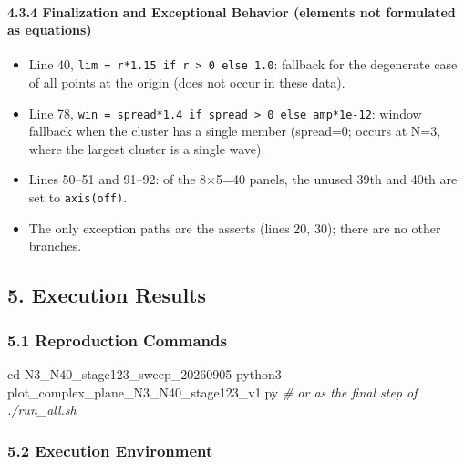 \documentclass[
  a4paper,
]{ltjsarticle}
\newenvironment{Shaded}{}{}
\newcommand{\BuiltInTok}[1]{\textcolor[rgb]{0.00,0.50,0.00}{#1}}
\newcommand{\CommentTok}[1]{\textcolor[rgb]{0.38,0.63,0.69}{\textit{#1}}}
\newcommand{\ExtensionTok}[1]{#1}
\newcommand{\NormalTok}[1]{#1}
\providecommand{\tightlist}{%
  \setlength{\itemsep}{0pt}\setlength{\parskip}{0pt}}
\begin{document}
\paragraph{4.3.4 Finalization and Exceptional Behavior (elements not
formulated as
equations)}\label{finalization-and-exceptional-behavior-elements-not-formulated-as-equations}

\begin{itemize}
\tightlist
\item
  Line 40, \texttt{lim\ =\ r*1.15\ if\ r\ \textgreater{}\ 0\ else\ 1.0}:
  fallback for the degenerate case of all points at the origin (does not
  occur in these data).
\item
  Line 78,
  \texttt{win\ =\ spread*1.4\ if\ spread\ \textgreater{}\ 0\ else\ amp*1e-12}:
  window fallback when the cluster has a single member (spread=0; occurs
  at N=3, where the largest cluster is a single wave).
\item
  Lines 50--51 and 91--92: of the 8×5=40 panels, the unused 39th and
  40th are set to
  \texttt{axis(\textquotesingle{}off\textquotesingle{})}.
\item
  The only exception paths are the asserts (lines 20, 30); there are no
  other branches.
\end{itemize}

\subsection{5. Execution Results}\label{execution-results}

\subsubsection{5.1 Reproduction Commands}\label{reproduction-commands}

\begin{Shaded}
\begin{Highlighting}[]
\BuiltInTok{cd}\NormalTok{ N3\_N40\_stage123\_sweep\_20260905}
\ExtensionTok{python3}\NormalTok{ plot\_complex\_plane\_N3\_N40\_stage123\_v1.py}
\CommentTok{\# or as the final step of ./run\_all.sh}
\end{Highlighting}
\end{Shaded}

\subsubsection{5.2 Execution Environment}\label{execution-environment}
\end{document}
